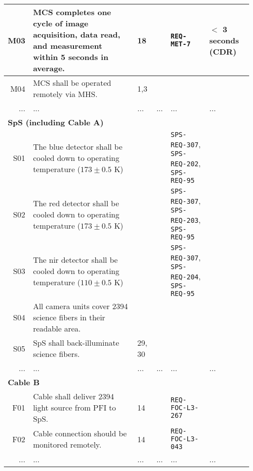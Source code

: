 \begin{landscape}
\begin{longtable}{r|p{100mm}|p{25mm}|c|p{30mm}|p{50mm}}
M03	& MCS completes one cycle of image acquisition, data read, and measurement within 5 seconds in average. 	& 18 	& 	& {\tt REQ-MET-7}	& $<$ 3 seconds (CDR) 	\\ \hline
M04	& MCS shall be operated remotely via MHS.	& 1,3	& 	& 	& 	\\ \hline
...	& ...	& ...	& ...	& ...	& ...	\\ \hline
\hline
\multicolumn{6}{l}{\hspace{5mm} {\bf SpS (including Cable A)}} \\ \hline
S01	& The blue detector shall be cooled down to operating temperature ($173 \pm 0.5$ K)	& 	& 	& {\tt SPS-REQ-307}, {\tt SPS-REQ-202}, {\tt SPS-REQ-95}	& 	\\ \hline
S02	& The red detector shall be cooled down to operating temperature ($173 \pm 0.5$ K)	& 	& 	& {\tt SPS-REQ-307}, {\tt SPS-REQ-203}, {\tt SPS-REQ-95}	& 	\\ \hline
S03	& The nir detector shall be cooled down to operating temperature ($110 \pm 0.5$ K)	& 	& 	& {\tt SPS-REQ-307}, {\tt SPS-REQ-204}, {\tt SPS-REQ-95}	& 	\\ \hline
S04	 & All camera units cover 2394 science fibers in their readable area.	& 	& 	& 	& 	\\ \hline
S05	 & SpS shall back-illuminate science fibers.	& 29, 30 	& 	& 	& 	\\ \hline
...	& ...	& ...	& ...	& ...	& ...	\\ \hline
\hline
\multicolumn{6}{l}{\hspace{5mm} {\bf Cable B}} \\ \hline
F01		& Cable shall deliver 2394 light source from PFI to SpS.	& 14	& 	& {\tt REQ-FOC-L3-267}	& 	\\ \hline
F02		& Cable connection should be monitored remotely. 	& 14	& 	& {\tt REQ-FOC-L3-043}	& 	\\ \hline
...	& ...	& ...	& ...	& ...	& ...	\\ \hline
\end{longtable}
\end{landscape}